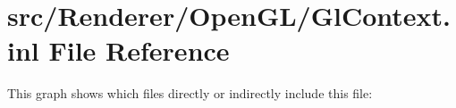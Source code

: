 \hypertarget{_gl_context_8inl}{\section{src/\+Renderer/\+Open\+G\+L/\+Gl\+Context.inl File Reference}
\label{_gl_context_8inl}
}
This graph shows which files directly or indirectly include this file\+:
